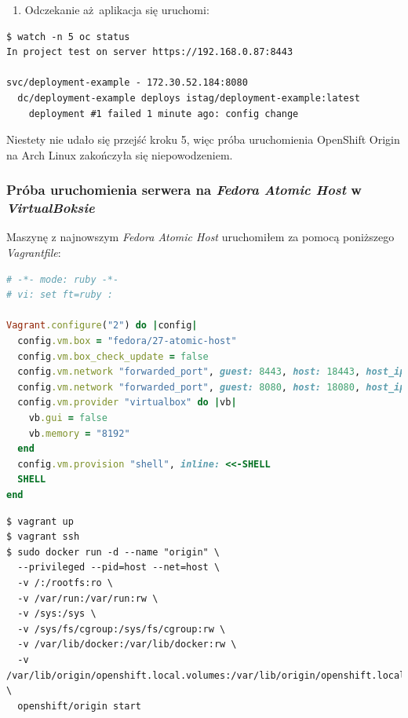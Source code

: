 \documentclass[a4paper,12pt,twoside,openany]{report}
\providecommand{\tightlist}{%
  \setlength{\itemsep}{0pt}\setlength{\parskip}{0pt}}
\begin{document}
\begin{enumerate}
\def\labelenumi{\arabic{enumi}.}
\setcounter{enumi}{5}
\tightlist
\item
  Odczekanie aż~aplikacja się uruchomi:
\end{enumerate}

\begin{lstlisting}
$ watch -n 5 oc status
In project test on server https://192.168.0.87:8443

svc/deployment-example - 172.30.52.184:8080
  dc/deployment-example deploys istag/deployment-example:latest 
    deployment #1 failed 1 minute ago: config change
\end{lstlisting}

Niestety nie udało się przejść kroku 5, więc próba uruchomienia
OpenShift Origin na Arch Linux zakończyła się niepowodzeniem.

\hypertarget{pruxf3ba-uruchomienia-serwera-na-fedora-atomic-host-w-virtualboksie}{%
\subsubsection{\texorpdfstring{Próba uruchomienia serwera na
\emph{Fedora Atomic Host} w
\emph{VirtualBoksie}}{Próba uruchomienia serwera na Fedora Atomic Host w VirtualBoksie}}\label{pruxf3ba-uruchomienia-serwera-na-fedora-atomic-host-w-virtualboksie}}

Maszynę z najnowszym \emph{Fedora Atomic Host} uruchomiłem za pomocą
poniższego \emph{Vagrantfile}:

\begin{lstlisting}[language=Ruby]
# -*- mode: ruby -*-
# vi: set ft=ruby :

Vagrant.configure("2") do |config|
  config.vm.box = "fedora/27-atomic-host"
  config.vm.box_check_update = false
  config.vm.network "forwarded_port", guest: 8443, host: 18443, host_ip: "127.0.0.1"
  config.vm.network "forwarded_port", guest: 8080, host: 18080, host_ip: "127.0.0.1"
  config.vm.provider "virtualbox" do |vb|
    vb.gui = false
    vb.memory = "8192"
  end
  config.vm.provision "shell", inline: <<-SHELL
  SHELL
end
\end{lstlisting}

\begin{lstlisting}
$ vagrant up
$ vagrant ssh
$ sudo docker run -d --name "origin" \
  --privileged --pid=host --net=host \
  -v /:/rootfs:ro \
  -v /var/run:/var/run:rw \
  -v /sys:/sys \
  -v /sys/fs/cgroup:/sys/fs/cgroup:rw \
  -v /var/lib/docker:/var/lib/docker:rw \
  -v /var/lib/origin/openshift.local.volumes:/var/lib/origin/openshift.local.volumes:rslave \
  openshift/origin start
\end{lstlisting}
\end{document}
